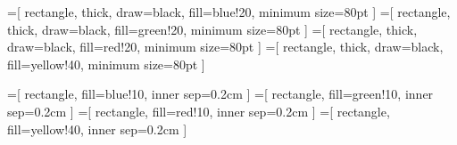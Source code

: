 \documentclass[a4paper]{article}
\begin{document}
=[
    rectangle,
    thick,
    draw=black,
    fill=blue!20,
    minimum size=80pt
]
=[
    rectangle,
    thick,
    draw=black,
    fill=green!20,
    minimum size=80pt
]
=[
    rectangle,
    thick,
    draw=black,
    fill=red!20,
    minimum size=80pt
]
=[
    rectangle,
    thick,
    draw=black,
    fill=yellow!40,
    minimum size=80pt
]

=[
    rectangle,
    fill=blue!10,
    inner sep=0.2cm
]
=[
    rectangle,
    fill=green!10,
    inner sep=0.2cm
]
=[
    rectangle,
    fill=red!10,
    inner sep=0.2cm
]
=[
    rectangle,
    fill=yellow!40,
    inner sep=0.2cm
]

\newcommand\particleblue[5]{%
    \node (#1) [particleblue]{
        \Huge${\boldsymbol{#2}}$};
    \node[below=11pt]{%
        \tiny
        \begin{tabular}{@{}p{17pt}p{43pt}@{}}
        Mass:&${#3}$\\
        Charge:&${#4}$\\
        Spin:&${#5}$
        \end{tabular}
    };
}
\newcommand\particlegreen[5]{%
    \node (#1) [particlegreen]{
        \Huge${\boldsymbol{#2}}$};
    \node[below=11pt]{%
        \tiny
        \begin{tabular}{@{}p{17pt}p{43pt}@{}}
        Mass:&${#3}$\\
        Charge:&${#4}$\\
        Spin:&${#5}$
        \end{tabular}
    };
}
\newcommand\particlered[5]{%
    \node (#1) [particlered]{
        \Huge${\boldsymbol{#2}}$};
    \node[below=11pt]{%
        \tiny
        \begin{tabular}{@{}p{17pt}p{43pt}@{}}
        Mass:&${#3}$\\
        Charge:&${#4}$\\
        Spin:&${#5}$
        \end{tabular}
    };
}
\newcommand\particleyellow[5]{%
    \node (#1) [particleyellow]{
        \Huge${\boldsymbol{#2}}$};
    \node[below=11pt]{%
        \tiny
        \begin{tabular}{@{}p{17pt}p{43pt}@{}}
        Mass:&${#3}$\\
        Charge:&${#4}$\\
        Spin:&${#5}$
        \end{tabular}
    };
}
\end{document}
